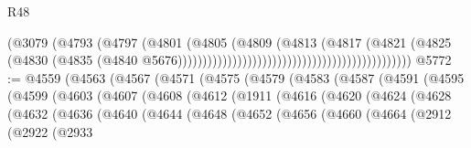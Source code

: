 \begin{lexlean}{R48}
\begin{coremodule}
                                                                        (@3079
                                                                          (@4793
                                                                            (@4797
                                                                              (@4801
                                                                                (@4805
                                                                                  (@4809
                                                                                    (@4813
                                                                                      (@4817
                                                                                        (@4821
                                                                                          (@4825
                                                                                            (@4830
                                                                                              (@4835
                                                                                                (@4840
                                                                                                  @5676)))))))))))))))))))))))))))))))))))))))))))))))
@5772 := @4559
    (@4563
      (@4567
        (@4571
          (@4575
            (@4579
              (@4583
                (@4587
                  (@4591
                    (@4595
                      (@4599
                        (@4603
                          (@4607
                            (@4608
                              (@4612
                                (@1911
                                  (@4616
                                    (@4620
                                      (@4624
                                        (@4628
                                          (@4632
                                            (@4636
                                              (@4640
                                                (@4644
                                                  (@4648
                                                    (@4652
                                                      (@4656
                                                        (@4660
                                                          (@4664
                                                            (@2912
                                                              (@2922
                                                                (@2933

\end{coremodule}
\end{lexlean}
